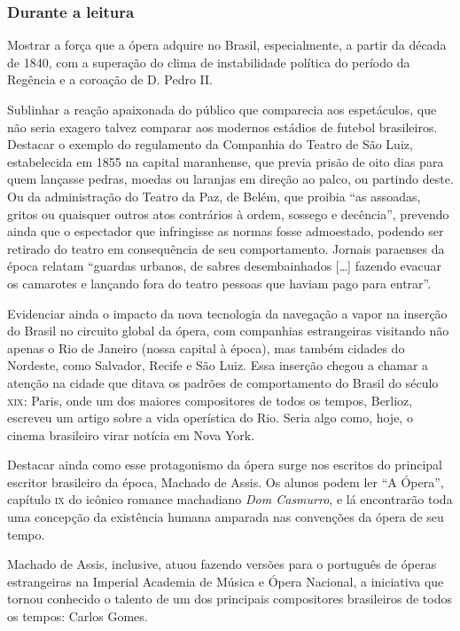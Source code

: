 \documentclass[11pt]{extarticle}
\begin{document}
\subsubsection{Durante a leitura}

Mostrar a força que a ópera adquire no Brasil, especialmente, a partir da
década de 1840, com a superação do clima de instabilidade política do período
da Regência e a coroação de D. Pedro II.

Sublinhar a reação apaixonada do público que comparecia aos espetáculos, que
não seria exagero talvez comparar aos modernos estádios de futebol brasileiros.
Destacar o exemplo do regulamento da Companhia do Teatro de São Luiz,
estabelecida em 1855 na capital maranhense, que previa prisão de oito dias para
quem lançasse pedras, moedas ou laranjas em direção ao palco, ou partindo
deste. Ou da administração do Teatro da Paz, de Belém, que proibia ``as
assoadas, gritos ou quaisquer outros atos contrários à ordem, sossego e
decência'', prevendo ainda que o espectador que infringisse as normas fosse
admoestado, podendo ser retirado do teatro em consequência de seu
comportamento. Jornais paraenses da época relatam “guardas urbanos, de sabres
desembainhados […] fazendo evacuar os camarotes e lançando fora do teatro
pessoas que haviam pago para entrar”.

Evidenciar ainda o impacto da nova tecnologia da navegação a vapor na inserção
do Brasil no circuito global da ópera, com companhias estrangeiras visitando
não apenas o Rio de Janeiro (nossa capital à época), mas também cidades do
Nordeste, como Salvador, Recife e São Luiz. Essa inserção chegou a chamar a
atenção na cidade que ditava os padrões de comportamento do Brasil do século
\textsc{xix}: Paris, onde um dos maiores compositores de todos os tempos, Berlioz,
escreveu um artigo sobre a vida operística do Rio. Seria algo como, hoje, o
cinema brasileiro virar notícia em Nova York.

Destacar ainda como esse protagonismo da ópera surge nos escritos do principal
escritor brasileiro da época, Machado de Assis. Os alunos podem ler ``A Ópera'',
capítulo \textsc{ix} do icônico romance machadiano \emph{Dom Casmurro}, e lá encontrarão toda
uma concepção da existência humana amparada nas convenções da ópera de seu
tempo.

Machado de Assis, inclusive, atuou fazendo versões para o português de óperas
estrangeiras na Imperial Academia de Música e Ópera Nacional, a iniciativa que
tornou conhecido o talento de um dos principais compositores brasileiros de
todos os tempos: Carlos Gomes.
\end{document}

